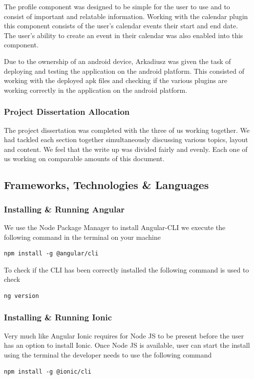 \documentclass[a4paper,12pt]{report}
\begin{document}
The profile component was designed to be simple for the user to use and to consist of important and relatable information.
Working with the calendar plugin this component consists of the user's calendar events their start and end date. The user's ability to create an event in their calendar was also enabled into this component.

Due to the ownership of an android device, Arkadiusz was given the task of deploying and testing the application on the android platform. This consisted of working with the deployed apk files and checking if the various plugins are working correctly in the application on the android platform.

\subsubsection{Project Dissertation Allocation}
The project dissertation was completed with the three of us working together. We had tackled each section together simultaneously discussing various topics, layout and content.
We feel that the write up was divided fairly and evenly. Each one of us working on comparable amounts of this document.


\subsection{Frameworks, Technologies \& Languages}
\subsubsection{Installing \& Running Angular}
We use the Node Package Manager to install Angular-CLI we execute the following command in the terminal on your machine 
\begin{verbatim}
npm install -g @angular/cli
\end{verbatim}
To check if the CLI has been correctly installed the following command is used to check
\begin{verbatim}
ng version
\end{verbatim}

\subsubsection{Installing \& Running Ionic }
Very much like Angular Ionic requires for Node JS to be present before the user has an option to install Ionic.
Once Node JS is available, user can start the install using the terminal the developer needs to use the following command 
\begin{verbatim}
npm install -g @ionic/cli    
\end{verbatim}
\end{document}
